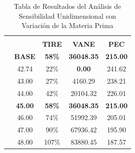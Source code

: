 \documentclass[a4paper,openright,12pt]{book}
\begin{document}
\begin{table}[H]
\begin{tabular}{lcccc}
                                                   & \multicolumn{1}{l}{}              & \multicolumn{3}{c}{\cellcolor[HTML]{1D6194}{\color[HTML]{FFFFFF} \textbf{RESULTADOS}}}                               \\
\multicolumn{1}{c}{}                               & \cellcolor[HTML]{D9D9D9}\textbf{} & \cellcolor[HTML]{D9D9D9}\textbf{TIRE} & \cellcolor[HTML]{D9D9D9}\textbf{VANE} & \cellcolor[HTML]{D9D9D9}\textbf{PEC} \\
\cellcolor[HTML]{75BDA7}                           & \textbf{BASE}                     & \textbf{58\%}                         & \textbf{36048.35}                     & \textbf{215.00}                      \\
\cellcolor[HTML]{75BDA7}                           & \cellcolor[HTML]{FFFF00}42.74     & 22\%                                  & \textbf{0.00}                         & 241.62                               \\
\cellcolor[HTML]{75BDA7}                           & 43.00                             & 27\%                                  & 4160.29                               & 238.21                               \\
\cellcolor[HTML]{75BDA7}                           & 44.00                             & 42\%                                  & 20104.32                              & 226.01                               \\
\rowcolor[HTML]{ABD8CA} 
\multicolumn{1}{c}{\cellcolor[HTML]{75BDA7}PRECIO} & \textbf{45.00}                    & \textbf{58\%}                         & \textbf{36048.35}                     & \textbf{215.00}                      \\
\cellcolor[HTML]{75BDA7}                           & 46.00                             & 74\%                                  & 51992.39                              & 205.01                               \\
\cellcolor[HTML]{75BDA7}                           & 47.00                             & 90\%                                  & 67936.42                              & 195.90                               \\
\cellcolor[HTML]{75BDA7}                           & 48.00                             & 107\%                                 & 83880.45                              & 187.57                              
\end{tabular}
\caption{Tabla de Resultados del Análisis de Sensibilidad Unidimensional con Variación de la Materia Prima}
\label{Tabla20}
\end{table}
\end{document}
